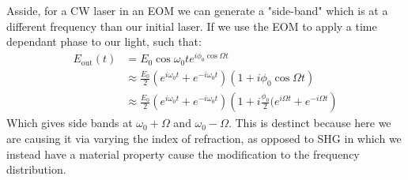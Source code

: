 Asside, for a CW laser in an EOM we can generate a "side-band" which is at a different frequency than our initial laser. If we use the EOM to apply a time dependant phase to our light, such that:
\begin{align*}
	E_\text{out}(t) &= E_0 \cos\omega_0 t e^{i\phi_0\cos\Omega t} \\
	&\approx \frac{E_0}{2}(e^{i\omega_0 t} + e^{-i\omega_0 t})\left(1 + i\phi_0\cos\Omega t\right) \\
	&\approx \frac{E_0}{2}(e^{i\omega_0 t} + e^{-i\omega_0 t})\left(1 + i\frac{\phi_0}{2}(e^{i\Omega t} + e^{-i\Omega t}\right)
\end{align*}
Which gives side bands at $\omega_0 + \Omega$ and $\omega_0 - \Omega$. This is destinct because here we are causing it via varying the index of refraction, as opposed to SHG in which we instead have a material property cause the modification to the frequency distribution.

